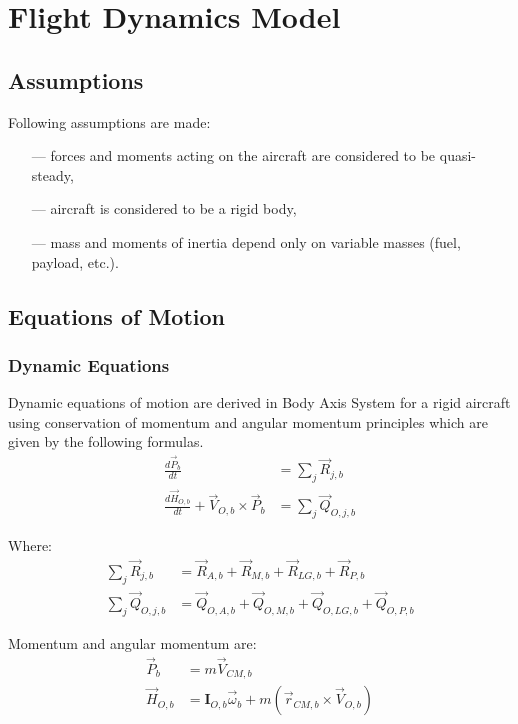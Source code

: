 \chapter{Flight Dynamics Model}

\section{Assumptions}

Following assumptions are made:
\begin{itemize}
  \item[---] forces and moments acting on the aircraft are considered to be quasi-steady,
  \item[---] aircraft is considered to be a rigid body,
  \item[---] mass and moments of inertia depend only on variable masses (fuel, payload, etc.).
\end{itemize}

\section{Equations of Motion}

\subsection{Dynamic Equations}

Dynamic equations of motion are derived in Body Axis System for a rigid aircraft using conservation of momentum and angular momentum principles which are given by the following formulas. \cite{Taylor2005, Osinski1997, Leyko2002}
\begin{align}
  \label{eq-fdm-mom-deriv-1}
  \frac{d {\vec P}_b}{dt}
  &=
  \sum_{j} {\vec R}_{j,b} \\
  \label{eq-fdm-ang-mom-deriv-1}
  \frac{d {\vec H}_{O,b}}{dt} + {\vec V}_{O,b} \times {\vec P}_b
  &=
  \sum_{j} {\vec Q}_{O,j,b}
\end{align}

Where:
\begin{align}
  \sum_{j} {\vec R}_{j,b}
  &=
  {\vec R}_{A,b} + {\vec R}_{M,b} + {\vec R}_{LG,b} + {\vec R}_{P,b} \\
  \sum_{j} {\vec Q}_{O,j,b}
  &=
  {\vec Q}_{O,A,b} + {\vec Q}_{O,M,b} + {\vec Q}_{O,LG,b} + {\vec Q}_{O,P,b}
\end{align}

Momentum and angular momentum are: \cite{Osinski1997, Leyko2002}
\begin{align}
  \label{eq-fdm-mom-1} 
  {\vec P}_b
  &=
  m {\vec V}_{CM,b} \\
  \label{eq-fdm-ang-mom-1}
  {\vec H}_{O,b}
  &=
  {\boldsymbol I}_{O,b} {\vec \omega}_b
  +
  m \left( {\vec r}_{CM,b}
  \times
  {\vec V}_{O,b} \right)
\end{align}

